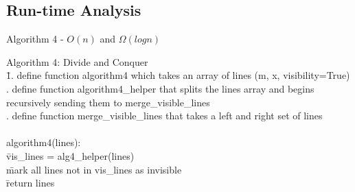 \documentclass{article}
\begin{document}
\subsection*{Run-time Analysis}

Algorithm 4 - $O(n)$ and $\Omega(log n)$

\begin{tabbing}
  {\sc Algorithm 4: Divide and Conquer}\\


  \qquad \= 1. define function algorithm4 which takes an array of lines (m, x, visibility=True) \\
  . define function algorithm4\_helper that splits the lines array and begins recursively sending them to merge\_visible\_lines \\
  . define function merge\_visible\_lines that takes a left and right set of lines\\
  \> \\

  \> algorithm4(lines): \\
    \> \qquad \= vis\_lines = alg4\_helper(lines)\\
    \> \qquad \= mark all lines not in vis\_lines as invisible\\
    \> \qquad \= return lines\\
    \> \\


\end{tabbing}
\end{document}
